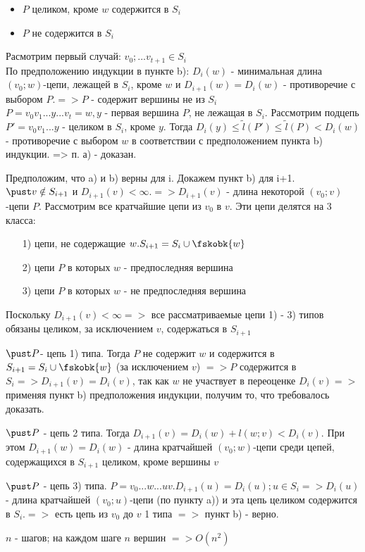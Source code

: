 \begin{proofs}
\begin{dokvo}
\begin{enumerate*}
			\begin{itemize}
			 	\item $P$ целиком, кроме $w$ содержится в $S_i$
			 	\item  $P$ не содержится в $S_i$
			\end{itemize}
			Расмотрим первый случай: $v_0;...v_{t+1} \in S_i$\\
			По предположению индукции в пункте b): $D_i(w)$ - минимальная длина $(v_0;w)$-цепи, лежащей в $S_i$, кроме $w$ и $D_{i+1}(w) = D_i(w)$ - противоречие с выбором $P. => P$ - содержит вершины не из $S_i$\\
			$P=v_0v_1...y...v_t=w, y$ - первая вершина $P$, не лежащая в $S_i$. Рассмотрим подцепь $P'= v_0v_1...y$ - целиком в $S_i$, кроме $y$. Тогда $D_i(y) \leq \widetilde{l}(P') \leq \widetilde{l}(P) < D_i(w)$ - противоречие с выбором $w$ в соответствии с предположением пункта b) индукции. => п. а) - доказан.
			\item Предположим, что a) и b) верны для i. Докажем пункт b) для i+1.\\
			$\pust v \notin S_{i+1}$ и $D_{i+1}(v) < \infty. => D_{i+1}(v)$ - длина некоторой $(v_0;v)$-цепи $P$. Рассмотрим все кратчайшие цепи из $v_0$ в $v$. Эти цепи делятся на 3 класса:
			\begin{itemize}
				\item[1)] цепи, не содержащие $w. S_{i+1} = S_i\cup\fskobk{w}$
				\item[2)]  цепи $P$ в которых $w$ - предпоследняя вершина
				\item[3)]  цепи $P$ в которых $w$ - не предпоследняя вершина
			\end{itemize}
			Поскольку $D_{i+1}(v) < \infty =>$ все рассматриваемые цепи 1) - 3) типов обязаны целиком, за исключением $v$, содержаться в $S_{i+1}$
			\item $\pust P$- цепь 1) типа. Тогда $P$ не содержит $w$ и содержится в $S_{i+1}=S_i\cup\fskobk{w}$ (за исключением $v$) $=> P$ содержится в $S_i => D_{i+1}(v) = D_i(v)$, так как $w$ не участвует в переоценке $D_i(v) =>$ применяя пункт b) предположения индукции, получим то, что требовалось доказать.
			\item $\pust P$ - цепь 2 типа. Тогда $D_{i+1}(v) = D_i(w) + l(w; v) < D_i(v)$. При этом $D_{i+1}(w) = D_i(w)$ - длина кратчайшей $(v_0; w)$-цепи среди цепей, содержащихся в $S_{i+1}$ целиком, кроме вершины $v$
			\item $\pust P$ - цепь 3) типа. $P = v_0...w...uv. D_{i+1}(u) = D_i(u); u \in S_i => D_i(u)$ - длина кратчайшей $(v_0; u)$-цепи (по пункту a)) и эта цепь целиком содержится в $S_i. =>$ есть цепь из $v_0$ до $v$ 1 типа $=>$ пункт b) - верно.
			\item $n$ - шагов; на каждом шаге $n$ вершин $=> O(n^2)$ 
		\end{enumerate*}
	\end{dokvo}	
\end{proofs}
\newpage
